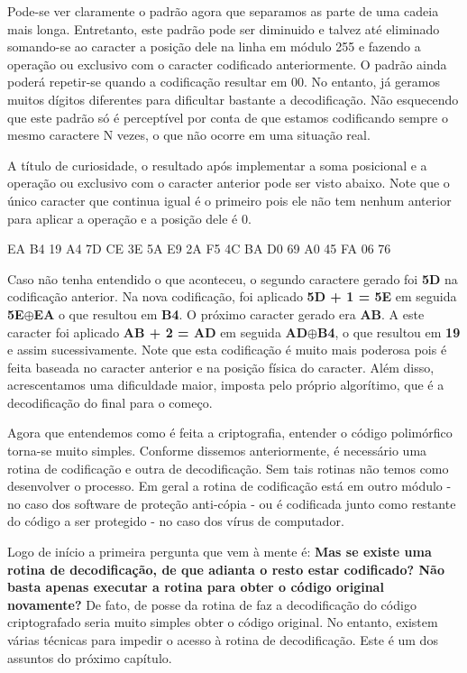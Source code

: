 Pode-se ver claramente o padrão agora que separamos as parte de uma cadeia mais longa. Entretanto, este padrão pode ser diminuido e talvez até eliminado somando-se ao caracter a posição dele na linha em módulo 255 e fazendo a operação ou exclusivo com o caracter codificado anteriormente. O padrão ainda poderá repetir-se quando a codificação resultar em 00. No entanto, já geramos muitos dígitos diferentes para dificultar bastante a decodificação. Não esquecendo que este  padrão só é perceptível por conta de que estamos codificando sempre o mesmo caractere N vezes, o que não ocorre em uma situação real.

A título de curiosidade, o resultado após implementar a soma posicional e a operação ou exclusivo com o caracter anterior pode ser visto abaixo. Note que o único caracter que continua igual é o primeiro pois ele não tem nenhum anterior para aplicar a operação e a posição dele é 0.
\begin{center}
EA B4 19 A4 7D CE 3E 5A E9 2A F5 4C BA D0 69 A0 45 FA 06 76
\end{center}
Caso não tenha entendido o que aconteceu, o segundo caractere gerado foi \textbf{5D} na codificação anterior. Na nova codificação, foi aplicado \textbf{5D + 1 = 5E} em seguida \textbf{5E$ \oplus $EA} o que resultou em \textbf{B4}. O próximo caracter gerado era \textbf{AB}. A este caracter foi aplicado \textbf{AB + 2 = AD} em seguida \textbf{AD$ \oplus $B4}, o que resultou em \textbf{19} e assim sucessivamente. Note que esta codificação é muito mais poderosa pois é feita baseada no caracter anterior e na posição física do caracter. Além disso, acrescentamos uma dificuldade maior, imposta pelo próprio algorítimo, que é a decodificação do final para o começo.

Agora que entendemos como é feita a criptografia, entender o código polimórfico torna-se muito simples. Conforme dissemos anteriormente, é necessário uma rotina de codificação e outra de decodificação. Sem tais rotinas não temos como desenvolver o processo. Em geral a rotina de codificação está em outro módulo - no caso dos software de proteção anti-cópia - ou é codificada junto como restante do código a ser protegido - no caso dos vírus de computador.

Logo de início a primeira pergunta que vem à mente é: \textbf{Mas se existe uma rotina de decodificação, de que adianta o resto estar codificado? Não basta apenas executar a rotina para obter o código original novamente?} De fato, de posse da rotina de faz a decodificação do código criptografado seria muito simples obter o código original. No entanto, existem várias técnicas para impedir o acesso à rotina de decodificação. Este é um dos assuntos do próximo capítulo.

